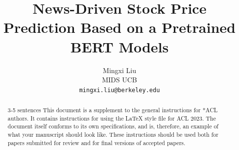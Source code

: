 \documentclass[11pt]{article}
\title{News-Driven Stock Price Prediction Based on a Pretrained BERT Models}
\author{Mingxi Liu \\
  MIDS UCB \\
  \texttt{mingxi.liu@berkeley.edu}}
\begin{document}
\maketitle
\begin{abstract}
 3-5 sentences
This document is a supplement to the general instructions for *ACL authors. It contains instructions for using the \LaTeX{} style file for ACL 2023.
The document itself conforms to its own specifications, and is, therefore, an example of what your manuscript should look like.
These instructions should be used both for papers submitted for review and for final versions of accepted papers.
\end{abstract}



\end{document}
